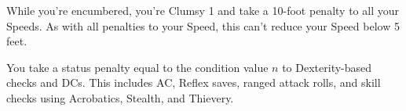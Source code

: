 



While you're encumbered, you're Clumsy 1 and take a 10-foot penalty to all your Speeds.
As with all penalties to your Speed, this can't reduce your Speed below 5 feet.



You take a status penalty equal to the condition value \(n\) to Dexterity-based checks and DCs.
This includes AC, Reflex saves, ranged attack rolls, and skill checks using Acrobatics, Stealth, and Thievery.

